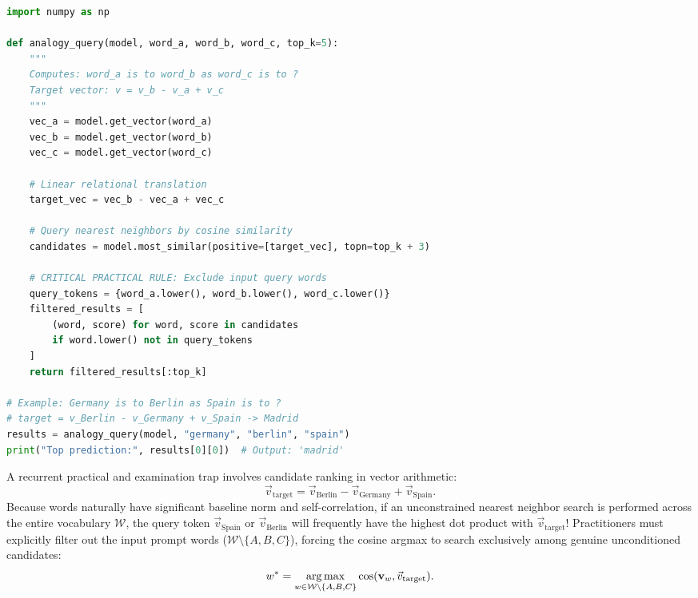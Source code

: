 \documentclass[../../main.tex]{subfiles}
\begin{document}
\begin{lstlisting}[language=Python, caption={Implementation of relational vector arithmetic and candidate filtering in Python \cite{giobergia2024gist}.}, label={lst:giobergia_gist}]
import numpy as np

def analogy_query(model, word_a, word_b, word_c, top_k=5):
    """
    Computes: word_a is to word_b as word_c is to ?
    Target vector: v = v_b - v_a + v_c
    """
    vec_a = model.get_vector(word_a)
    vec_b = model.get_vector(word_b)
    vec_c = model.get_vector(word_c)
    
    # Linear relational translation
    target_vec = vec_b - vec_a + vec_c
    
    # Query nearest neighbors by cosine similarity
    candidates = model.most_similar(positive=[target_vec], topn=top_k + 3)
    
    # CRITICAL PRACTICAL RULE: Exclude input query words
    query_tokens = {word_a.lower(), word_b.lower(), word_c.lower()}
    filtered_results = [
        (word, score) for word, score in candidates 
        if word.lower() not in query_tokens
    ]
    return filtered_results[:top_k]

# Example: Germany is to Berlin as Spain is to ?
# target = v_Berlin - v_Germany + v_Spain -> Madrid
results = analogy_query(model, "germany", "berlin", "spain")
print("Top prediction:", results[0][0])  # Output: 'madrid'
\end{lstlisting}

\begin{examinsight}
A recurrent practical and examination trap involves candidate ranking in vector arithmetic:
\begin{equation}
\label{eq:target_vector_exam}
\vec{v}_{\text{target}} = \vec{v}_{\text{Berlin}} - \vec{v}_{\text{Germany}} + \vec{v}_{\text{Spain}}.
\end{equation}
Because words naturally have significant baseline norm and self-correlation, if an unconstrained nearest neighbor search is performed across the entire vocabulary $\mathcal{W}$, the query token $\vec{v}_{\text{Spain}}$ or $\vec{v}_{\text{Berlin}}$ will frequently have the highest dot product with $\vec{v}_{\text{target}}$!
Practitioners must explicitly filter out the input prompt words ($\mathcal{W} \setminus \{A, B, C\}$), forcing the cosine argmax to search exclusively among genuine unconditioned candidates:
\begin{equation}
\label{eq:filtered_argmax}
w^* = \operatorname*{\mathrm{arg\,max}}_{w \in \mathcal{W} \setminus \{A, B, C\}} \cos(\mathbf{v}_w, \vec{v}_{\text{target}}).
\end{equation}
\end{examinsight}
\end{document}
